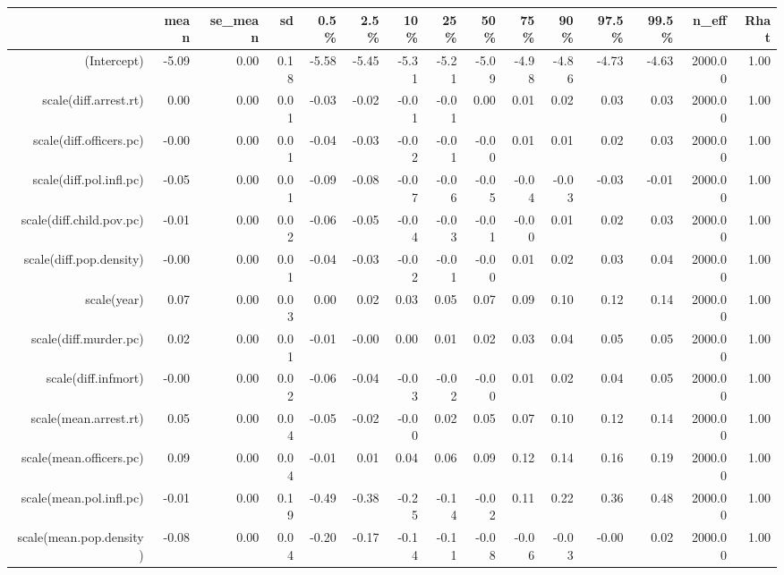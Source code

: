 \begin{table}[ht]
\centering
\begin{tabular}{rrrrrrrrrrrrrrr}
  \hline
 & mean & se\_mean & sd & 0.5\% & 2.5\% & 10\% & 25\% & 50\% & 75\% & 90\% & 97.5\% & 99.5\% & n\_eff & Rhat \\ 
  \hline
(Intercept) & -5.09 & 0.00 & 0.18 & -5.58 & -5.45 & -5.31 & -5.21 & -5.09 & -4.98 & -4.86 & -4.73 & -4.63 & 2000.00 & 1.00 \\ 
  scale(diff.arrest.rt) & 0.00 & 0.00 & 0.01 & -0.03 & -0.02 & -0.01 & -0.01 & 0.00 & 0.01 & 0.02 & 0.03 & 0.03 & 2000.00 & 1.00 \\ 
  scale(diff.officers.pc) & -0.00 & 0.00 & 0.01 & -0.04 & -0.03 & -0.02 & -0.01 & -0.00 & 0.01 & 0.01 & 0.02 & 0.03 & 2000.00 & 1.00 \\ 
  scale(diff.pol.infl.pc) & -0.05 & 0.00 & 0.01 & -0.09 & -0.08 & -0.07 & -0.06 & -0.05 & -0.04 & -0.03 & -0.03 & -0.01 & 2000.00 & 1.00 \\ 
  scale(diff.child.pov.pc) & -0.01 & 0.00 & 0.02 & -0.06 & -0.05 & -0.04 & -0.03 & -0.01 & -0.00 & 0.01 & 0.02 & 0.03 & 2000.00 & 1.00 \\ 
  scale(diff.pop.density) & -0.00 & 0.00 & 0.01 & -0.04 & -0.03 & -0.02 & -0.01 & -0.00 & 0.01 & 0.02 & 0.03 & 0.04 & 2000.00 & 1.00 \\ 
  scale(year) & 0.07 & 0.00 & 0.03 & 0.00 & 0.02 & 0.03 & 0.05 & 0.07 & 0.09 & 0.10 & 0.12 & 0.14 & 2000.00 & 1.00 \\ 
  scale(diff.murder.pc) & 0.02 & 0.00 & 0.01 & -0.01 & -0.00 & 0.00 & 0.01 & 0.02 & 0.03 & 0.04 & 0.05 & 0.05 & 2000.00 & 1.00 \\ 
  scale(diff.infmort) & -0.00 & 0.00 & 0.02 & -0.06 & -0.04 & -0.03 & -0.02 & -0.00 & 0.01 & 0.02 & 0.04 & 0.05 & 2000.00 & 1.00 \\ 
  scale(mean.arrest.rt) & 0.05 & 0.00 & 0.04 & -0.05 & -0.02 & -0.00 & 0.02 & 0.05 & 0.07 & 0.10 & 0.12 & 0.14 & 2000.00 & 1.00 \\ 
  scale(mean.officers.pc) & 0.09 & 0.00 & 0.04 & -0.01 & 0.01 & 0.04 & 0.06 & 0.09 & 0.12 & 0.14 & 0.16 & 0.19 & 2000.00 & 1.00 \\ 
  scale(mean.pol.infl.pc) & -0.01 & 0.00 & 0.19 & -0.49 & -0.38 & -0.25 & -0.14 & -0.02 & 0.11 & 0.22 & 0.36 & 0.48 & 2000.00 & 1.00 \\ 
  scale(mean.pop.density) & -0.08 & 0.00 & 0.04 & -0.20 & -0.17 & -0.14 & -0.11 & -0.08 & -0.06 & -0.03 & -0.00 & 0.02 & 2000.00 & 1.00 \\ 

\end{tabular}
\end{table}
